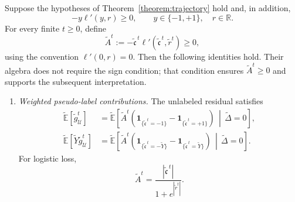 \begin{proposition}
\label{prop:weighted-pseudo-label-contributions}
Suppose the hypotheses of Theorem~\ref{theorem:trajectory} hold
and, in addition,
\[
    -y\ell'(y,r)\geq0,
    \qquad
    y\in\{-1,+1\},\quad r\in\mathbb R.
\]
For every finite $t\geq0$, define
\[
    \tilde A^t
    :=
    -\tilde{\mathfrak c}^{\,t}
        \ell'(\tilde{\mathfrak c}^{\,t},\tilde r^t)
    \geq0,
\]
using the convention $\ell'(0,r)=0$.
Then the following identities hold.
Their algebra does not require the sign condition;
that condition ensures $\tilde A^t\geq0$ and supports
the subsequent interpretation.

\begin{enumerate}[label=(\roman*),wide]
    \item \emph{Weighted pseudo-label contributions.}
    The unlabeled residual satisfies
    \begin{align}
        \tilde{\mathbb E}[\tilde g_{\mathcal U}^t]
        &=
        \tilde{\mathbb E}\left[
            \tilde A^t
            \left(
                \mathbf1_{\{\tilde{\mathfrak c}^{\,t}=-1\}}
                -
                \mathbf1_{\{\tilde{\mathfrak c}^{\,t}=+1\}}
            \right)
            \,\middle|\,\tilde\Delta=0
        \right],
        \label{eq:weighted-pseudo-label-imbalance}
        \\
        \tilde{\mathbb E}
            [\tilde Y\tilde g_{\mathcal U}^t]
        &=
        \tilde{\mathbb E}\left[
            \tilde A^t
            \left(
                \mathbf1_{\{\tilde{\mathfrak c}^{\,t}=-\tilde Y\}}
                -
                \mathbf1_{\{\tilde{\mathfrak c}^{\,t}=\tilde Y\}}
            \right)
            \,\middle|\,\tilde\Delta=0
        \right].
        \label{eq:weighted-pseudo-label-correctness}
    \end{align}
    For logistic loss,
    \[
        \tilde A^t
        =
        \frac{|\tilde{\mathfrak c}^{\,t}|}
             {1+e^{|\tilde r^t|}}.
    \]


\end{enumerate}
\end{proposition}
